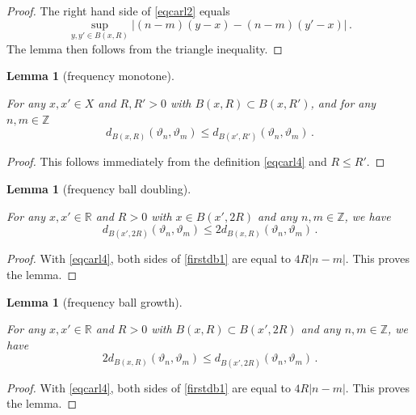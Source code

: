 \documentclass[10pt,a4paper]{article}
\theoremstyle{plain}
\newtheorem{lemma}[theorem]{Lemma}
\theoremstyle{definition}
\numberwithin{equation}{subsection}
\newcommand{\R}{{\mathbb{R}}}
\newcommand{\mfa}{{\vartheta}}
\newcommand{\lean}[1]{}
\newcommand{\uses}[1]{}
\newcommand{\leanok}{}
\begin{document}
\begin{proof}
\leanok
    The right hand side of \eqref{eqcarl2} equals
    $$
        \sup_{y,y'\in B(x,R)}|(n-m)(y-x)-(n-m)(y'-x)|\,.
    $$
    The lemma then follows from the triangle inequality.
\end{proof}

\begin{lemma}[frequency monotone]
\label{frequency-monotone}
\leanok
\lean{frequency_monotone}

    For any $x, x' \in X$ and $R, R' > 0$ with $B(x,R) \subset B(x, R')$, and for any $n, m \in \mathbb{Z}$
    $$
        d_{B(x,R)}(\mfa_n, \mfa_m) \le d_{B(x',R')}(\mfa_n, \mfa_m)\,.
    $$
\end{lemma}

\begin{proof}
\leanok
    This follows immediately from the definition \eqref{eqcarl4} and $R \le R'$.
\end{proof}

\begin{lemma}[frequency ball doubling]
\label{frequency-ball-doubling}
\leanok
\lean{frequency_ball_doubling}
\uses{frequency-metric}
  For any $x,x'\in \R$ and $R>0$ with
   $x\in B(x',2R)$ and any $n,m\in \mathbb{Z}$, we have
\begin{equation}\label{firstdb1}
    d_{B(x',2R)}(\mfa_n,\mfa_m)\le 2 d_{B(x,R)}(\mfa_n,\mfa_m) \, .
\end{equation}
\end{lemma}

\begin{proof}
\leanok
With \eqref{eqcarl4}, both sides of \eqref{firstdb1} are equal to $4R|n-m|$. This proves the lemma.
\end{proof}

\begin{lemma}[frequency ball growth]
\label{frequency-ball-growth}
\leanok
\lean{frequency_ball_growth}
    For any $x,x'\in \R$ and $R>0$ with
   $B(x,R)\subset B(x',2R)$ and any $n,m\in \mathbb{Z}$, we have
\begin{equation}\label{seconddb1}
    2d_{B(x,R)}(\mfa_n,\mfa_m)\le d_{B(x',2R)}(\mfa_n,\mfa_m) \, .
\end{equation}
\end{lemma}

\begin{proof}
\leanok
    With \eqref{eqcarl4}, both sides of \eqref{firstdb1} are equal to $4R|n-m|$. This proves the lemma.
\end{proof}
\end{document}
